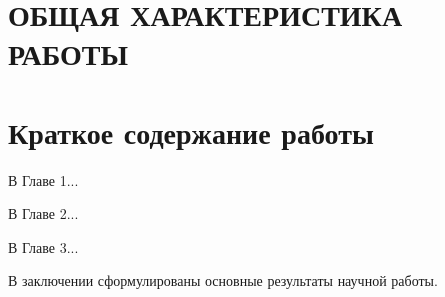 
\section*{ОБЩАЯ ХАРАКТЕРИСТИКА РАБОТЫ}

\newcommand{\actuality}{\pdfbookmark[1]{Актуальность}{actuality}\textbf{Актуальность темы.}\enspace\ignorespaces}
\newcommand{\aim}{\pdfbookmark[1]{Цель}{aim}\textbf{Цель работы.}\enspace\ignorespaces}
\newcommand{\tasks}{\pdfbookmark[1]{Задачи}{tasks}\textbf{Задачи работы.}\enspace\ignorespaces}
\newcommand{\novelty}{\pdfbookmark[1]{Новизна}{novelty}\textbf{Научная новизна.}\enspace\ignorespaces}
\newcommand{\influence}{\pdfbookmark[1]{Значимость}{influence}\textbf{Теоретическая и практическая значимость.}\enspace\ignorespaces}
\newcommand{\methods}{\pdfbookmark[1]{Методы}{methods}\textbf{Методы и инструменты исследования.}\enspace\ignorespaces}
\newcommand{\defpositions}{\pdfbookmark[1]{Положения}{defpositions}\textbf{Основные положения, выносимые на защиту.}\enspace\ignorespaces}
\newcommand{\relevance}{\pdfbookmark[1]{Соответствие специальности}{relevance}\textbf{Соответствие специальность.}\enspace\ignorespaces}
\newcommand{\reliability}{\pdfbookmark[1]{Достоверность}{reliability}\textbf{Достоверность результатов проведённых исследований.}\enspace\ignorespaces}
\newcommand{\probation}{\pdfbookmark[1]{Апробация}{probation}\textbf{Апробация работы.}\enspace\ignorespaces}
\newcommand{\contribution}{\pdfbookmark[1]{Вклад}{contribution}\textbf{Личный вклад автора.}\enspace\ignorespaces}
\newcommand{\publications}{\pdfbookmark[1]{Публикации}{publications}\textbf{Публикации по теме диссертации.}\enspace\ignorespaces}




\section*{Краткое содержание работы}

В Главе 1...

В Главе 2...

В Главе 3...

В заключении сформулированы основные результаты научной работы.


